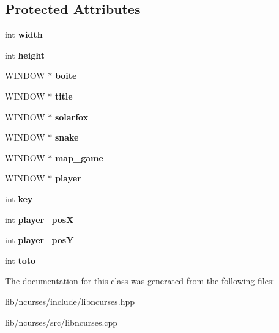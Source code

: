 \subsection*{Protected Attributes}
\begin{DoxyCompactItemize}
\item 
\mbox{\label{classlib___n_c_u_r_s_e_s_acba01d3cd85fa065bc3c11910cdda309}} 
int {\bfseries width}
\item 
\mbox{\label{classlib___n_c_u_r_s_e_s_aa08f865dfb9cc6835ff16acb0a34a65b}} 
int {\bfseries height}
\item 
\mbox{\label{classlib___n_c_u_r_s_e_s_ab428ae6d821c70906f24dc8748795122}} 
W\+I\+N\+D\+OW $\ast$ {\bfseries boite}
\item 
\mbox{\label{classlib___n_c_u_r_s_e_s_ac64a42181550a327cc96ab76ca821491}} 
W\+I\+N\+D\+OW $\ast$ {\bfseries title}
\item 
\mbox{\label{classlib___n_c_u_r_s_e_s_a6df8ab15e3f9490e787772e89b597e17}} 
W\+I\+N\+D\+OW $\ast$ {\bfseries solarfox}
\item 
\mbox{\label{classlib___n_c_u_r_s_e_s_a2192fd721f64e153103466a594587e6a}} 
W\+I\+N\+D\+OW $\ast$ {\bfseries snake}
\item 
\mbox{\label{classlib___n_c_u_r_s_e_s_a5a1139cdb112a6870a32310e12d75360}} 
W\+I\+N\+D\+OW $\ast$ {\bfseries map\+\_\+game}
\item 
\mbox{\label{classlib___n_c_u_r_s_e_s_a7d7217630e1047ed32ab9537632c03d5}} 
W\+I\+N\+D\+OW $\ast$ {\bfseries player}
\item 
\mbox{\label{classlib___n_c_u_r_s_e_s_a8c2210a4da28247f3bf0c3b331524059}} 
int {\bfseries key}
\item 
\mbox{\label{classlib___n_c_u_r_s_e_s_afc8535cdf6ef0699e0d71be39bb1c890}} 
int {\bfseries player\+\_\+posX}
\item 
\mbox{\label{classlib___n_c_u_r_s_e_s_a99c8b6694269388d8bc60c04ef1900de}} 
int {\bfseries player\+\_\+posY}
\item 
\mbox{\label{classlib___n_c_u_r_s_e_s_aa13e65d035b43e6a574c96aa268efe8c}} 
int {\bfseries toto}
\end{DoxyCompactItemize}


The documentation for this class was generated from the following files\+:\begin{DoxyCompactItemize}
\item 
lib/ncurses/include/libncurses.\+hpp\item 
lib/ncurses/src/libncurses.\+cpp\end{DoxyCompactItemize}
